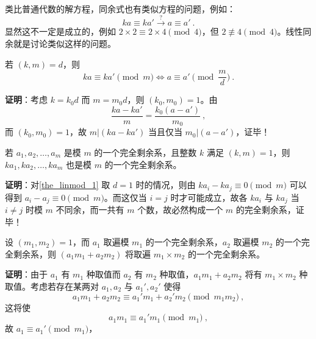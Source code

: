 

类比普通代数的解方程，同余式也有类似方程的问题，例如：
\begin{equation}
ka \equiv ka' \xrightarrow{?} a \equiv a'  ~.
\end{equation}
显然这不一定是成立的，例如 $2 \times 2 \equiv 2 \times 4 \pmod 4$，但 $2 \not \equiv 4 \pmod 4$。线性同余就是讨论类似这样的问题。

\begin{theorem}{}\label{the_linmod_1}
若 $(k, m) = d$，则
\begin{equation}
ka \equiv ka' \pmod m \Leftrightarrow a \equiv a' \pmod{\frac{m}{d}} ~.
\end{equation}
\end{theorem}
\textbf{证明}：考虑 $k = k_0 d$ 而 $m = m_0 d$，则 $(k_0, m_0) = 1$。由
\begin{equation}
\frac{ka - ka'}{m} = \frac{k_0(a - a')}{m_0} ~,
\end{equation}
而 $(k_0, m_0) = 1$，故 $m | (k a - k a')$ 当且仅当 $m_0 | (a - a')$，证毕！

\begin{theorem}{}\label{the_linmod_2}
若 $a_1, a_2, \dots, a_m$ 是模 $m$ 的一个完全剩余系，且整数 $k$ 满足 $(k, m) =1$，则 $ka_1, ka_2, \dots, ka_m$ 也是模 $m$ 的一个完全剩余系。
\end{theorem}
\textbf{证明}：对\autoref{the_linmod_1} 取 $d=1$ 时的情况，则由 $ka_i - ka_j \equiv 0 \pmod m$ 可以得到 $a_i - a_j \equiv 0 \pmod m$。而这仅当 $i = j$ 时才可能成立，故各 $ka_i$ 与 $ka_j$ 当 $i \neq j$ 时模 $m$ 不同余，而一共有 $m$ 个数，故必然构成一个 $m$ 的完全剩余系，证毕！

\begin{theorem}{}
设 $(m_1, m_2) = 1$，而 $a_1$ 取遍模 $m_1$ 的一个完全剩余系，$a_2$ 取遍模 $m_2$ 的一个完全剩余系，则 $(a_1 m_1 + a_2 m_2)$ 将取遍 $m_1 \times m_2$ 的一个完全剩余系。
\end{theorem}
\textbf{证明}：由于 $a_1$ 有 $m_1$ 种取值而 $a_2$ 有 $m_2$ 种取值，$a_1m_1+a_2m_2$ 将有 $m_1 \times m_2$ 种取值。考虑若存在某两对 $a_1, a_2$ 与 $a_1', a_2'$ 使得
\begin{equation}
a_1 m_1 + a_2 m_2 \equiv a_1' m_1 + a_2' m_2 \pmod{m_1 m_2} ~,
\end{equation}
这将使
\begin{equation}
a_1 m_1 \equiv a_1' m_1 \pmod {m_1} ~,
\end{equation}
故 $a_1 \equiv a_1' \pmod{m_1}$，



